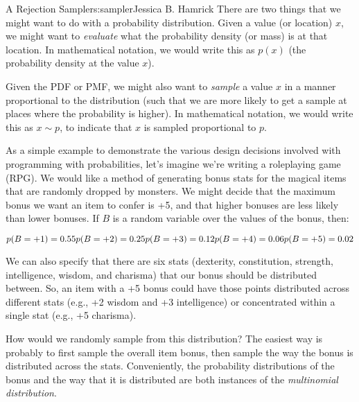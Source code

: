\begin{aosachapter}{A Rejection Sampler}{s:sampler}{Jessica B. Hamrick}
There are two things that we might want to do with a probability
distribution. Given a value (or location) $x$, we might want to
\emph{evaluate} what the probability density (or mass) is at that
location. In mathematical notation, we would write this as $p(x)$ (the
probability density at the value $x$).

Given the PDF or PMF, we might also want to \emph{sample} a value $x$ in
a manner proportional to the distribution (such that we are more likely
to get a sample at places where the probability is higher). In
mathematical notation, we would write this as $x\sim p$, to indicate
that $x$ is sampled proportional to $p$.

\label{sampling-magical-items}

As a simple example to demonstrate the various design decisions involved
with programming with probabilities, let's imagine we're writing a
roleplaying game (RPG). We would like a method of generating bonus stats
for the magical items that are randomly dropped by monsters. We might
decide that the maximum bonus we want an item to confer is +5, and that
higher bonuses are less likely than lower bonuses. If $B$ is a random
variable over the values of the bonus, then:

\[
p(B=\mathrm{+1}) = 0.55\\
p(B=\mathrm{+2}) = 0.25\\
p(B=\mathrm{+3}) = 0.12\\
p(B=\mathrm{+4}) = 0.06\\
p(B=\mathrm{+5}) = 0.02
\]

We can also specify that there are six stats (dexterity, constitution,
strength, intelligence, wisdom, and charisma) that our bonus should be
distributed between. So, an item with a +5 bonus could have those points
distributed across different stats (e.g., +2 wisdom and +3 intelligence)
or concentrated within a single stat (e.g., +5 charisma).

How would we randomly sample from this distribution? The easiest way is
probably to first sample the overall item bonus, then sample the way the
bonus is distributed across the stats. Conveniently, the probability
distributions of the bonus and the way that it is distributed are both
instances of the \emph{multinomial distribution}.

\label{the-multinomial-distribution}


\end{aosachapter}
